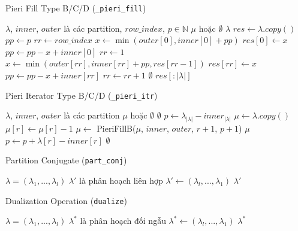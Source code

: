 \begin{algorithm}[H]
\caption{Pieri Fill Type B/C/D (\texttt{\_pieri\_fill})}
\begin{algorithmic}[1]
\REQUIRE $\lambda$, $inner$, $outer$ là các partition, $row\_index$, $p \in \mathbb{N}$
\ENSURE $\mu$ hoặc $\emptyset$
\IF{$\lambda = \emptyset$}
    \RETURN $\lambda$
\ENDIF
\STATE $res \gets \lambda.copy()$
\STATE $pp \gets p$
\STATE $rr \gets row\_index$
    \STATE $x \gets \min(outer[0], inner[0] + pp)$
    \STATE $res[0] \gets x$
    \STATE $pp \gets pp - x + inner[0]$
    \STATE $rr \gets 1$
\ENDIF
{}
    \STATE $x \gets \min(outer[rr], inner[rr] + pp, res[rr-1])$
    \STATE $res[rr] \gets x$
    \STATE $pp \gets pp - x + inner[rr]$
    \STATE $rr \gets rr + 1$
\ENDWHILE
{}
    \RETURN $\emptyset$
\ENDIF
\RETURN $res[:|\lambda|]$
\end{algorithmic}
\end{algorithm}

\begin{algorithm}[H]
\caption{Pieri Iterator Type B/C/D (\texttt{\_pieri\_itr})}
\begin{algorithmic}[1]
\REQUIRE $\lambda$, $inner$, $outer$ là các partition
\ENSURE $\mu$ hoặc $\emptyset$
\IF{$\lambda = \emptyset$}
    \RETURN $\emptyset$
\ENDIF
\STATE $p \gets \lambda_{|\lambda|} - inner_{|\lambda|}$
        \STATE $\mu \gets \lambda.copy()$
        \STATE $\mu[r] \gets \mu[r] - 1$
        \STATE $\mu \gets$ PieriFillB($\mu$, $inner$, $outer$, $r+1$, $p+1$)
        \IF{$\mu \neq \emptyset$}
            \RETURN $\mu$
        \ENDIF
    \ENDIF
    \STATE $p \gets p + \lambda[r] - inner[r]$
\ENDFOR
\RETURN $\emptyset$
\end{algorithmic}
\end{algorithm}

\begin{algorithm}[H]
\caption{Partition Conjugate (\texttt{part\_conj})}
\begin{algorithmic}[1]
\REQUIRE $\lambda = (\lambda_1, ..., \lambda_l)$
\ENSURE $\lambda'$ là phân hoạch liên hợp
\STATE $\lambda' \gets (\lambda_l, ..., \lambda_1)$
\RETURN $\lambda'$
\end{algorithmic}
\end{algorithm}


\begin{algorithm}[H]
\caption{Dualization Operation (\texttt{dualize})}
\begin{algorithmic}[1]
\REQUIRE $\lambda = (\lambda_1, ..., \lambda_l)$
\ENSURE $\lambda^*$ là phân hoạch đối ngẫu
\STATE $\lambda^* \gets (\lambda_l, ..., \lambda_1)$
\RETURN $\lambda^*$
\end{algorithmic}
\end{algorithm}

